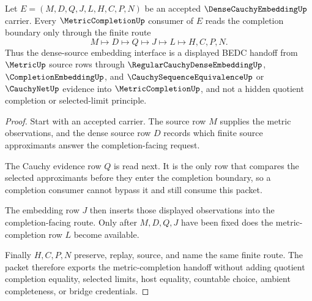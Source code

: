 \begin{theorem}
\label{thm:dense-cauchy-embedding-metric-completion-handoff}
Let $E=(M,D,Q,J,L,H,C,P,N)$ be an accepted $\DenseCauchyEmbeddingUp$ carrier. Every $\MetricCompletionUp$ consumer of $E$ reads the completion boundary only through the finite route
$$
M \longmapsto D \longmapsto Q \longmapsto J \longmapsto L \longmapsto H,C,P,N .
$$
Thus the dense-source embedding interface is a displayed BEDC handoff from $\MetricUp$ source rows through $\RegularCauchyDenseEmbeddingUp$, $\CompletionEmbeddingUp$, and $\CauchySequenceEquivalenceUp$ or $\CauchyNetUp$ evidence into $\MetricCompletionUp$, and not a hidden quotient completion or selected-limit principle.
\end{theorem}
\begin{proof}
Start with an accepted carrier. The source row $M$ supplies the metric observations, and the dense source row $D$ records which finite source approximants answer the completion-facing request.

The Cauchy evidence row $Q$ is read next. It is the only row that compares the selected approximants before they enter the completion boundary, so a completion consumer cannot bypass it and still consume this packet.

The embedding row $J$ then inserts those displayed observations into the completion-facing route. Only after $M,D,Q,J$ have been fixed does the metric-completion row $L$ become available.

Finally $H,C,P,N$ preserve, replay, source, and name the same finite route. The packet therefore exports the metric-completion handoff without adding quotient completion equality, selected limits, host equality, countable choice, ambient completeness, or bridge credentials.
\end{proof}



